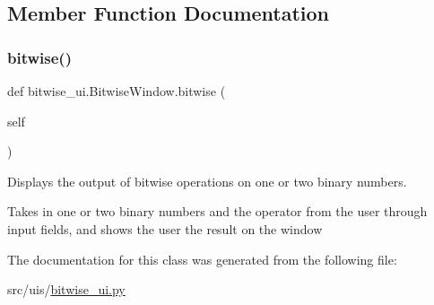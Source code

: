 \subsection{Member Function Documentation}
\mbox{\label{classbitwise__ui_1_1_bitwise_window_a3eafe17fad0d129cd2bbab0d84e0e450}} 
\subsubsection{\texorpdfstring{bitwise()}{bitwise()}}
{\footnotesize\ttfamily def bitwise\+\_\+ui.\+Bitwise\+Window.\+bitwise (\begin{DoxyParamCaption}\item[{}]{self }\end{DoxyParamCaption})}



Displays the output of bitwise operations on one or two binary numbers. 

Takes in one or two binary numbers and the operator from the user through input fields, and shows the user the result on the window 

The documentation for this class was generated from the following file\+:\begin{DoxyCompactItemize}
\item 
src/uis/\hyperlink{bitwise__ui_8py}{bitwise\+\_\+ui.\+py}\end{DoxyCompactItemize}
